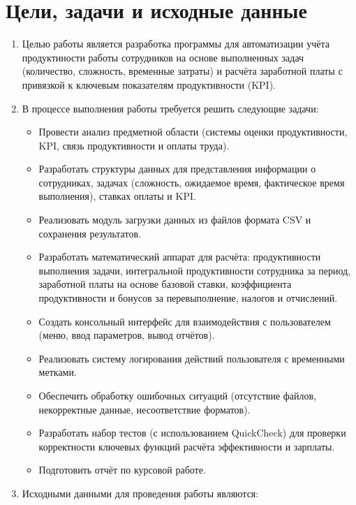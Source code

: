 \documentclass[a4paper, 14pt]{extarticle} %
\begin{document}
    \section{Цели, задачи и исходные данные}
        \begin{enumerate}[label=\alph*.]
            \item Целью работы является разработка программы для автоматизации учёта продуктиности работы сотрудников на основе выполненных задач (количество, сложность, временные затраты) и расчёта заработной платы с привязкой к ключевым показателям продуктивности (KPI). 
            \item В процессе выполнения работы требуется решить следующие задачи:
                \begin{itemize}
                    \item Провести анализ предметной области (системы оценки продуктивности, KPI, связь продуктивности и оплаты труда).
                    \item Разработать структуры данных для представления информации о сотрудниках, задачах (сложность, ожидаемое время, фактическое время выполнения), ставках оплаты и KPI.
                    \item Реализовать модуль загрузки данных из файлов формата CSV и сохранения результатов.
                    \item Разработать математический аппарат для расчёта: продуктивности выполнения задачи, интегральной продуктивности сотрудника за период, заработной платы на основе базовой ставки, коэффициента продуктивности и бонусов за перевыполнение, налогов и отчислений.
                    \item Создать консольный интерфейс для взаимодействия с пользователем (меню, ввод параметров, вывод отчётов).
                    \item Реализовать систему логирования действий пользователя с временными метками.
                    \item Обеспечить обработку ошибочных ситуаций (отсутствие файлов, некорректные данные, несоответствие форматов).
                    \item Разработать набор тестов (с использованием QuickCheck) для проверки корректности ключевых функций расчёта эффективности и зарплаты.
                    \item Подготовить отчёт по курсовой работе.
                \end{itemize}
            \item Исходными данными для проведения работы являются:

\end{enumerate}
\end{document}
